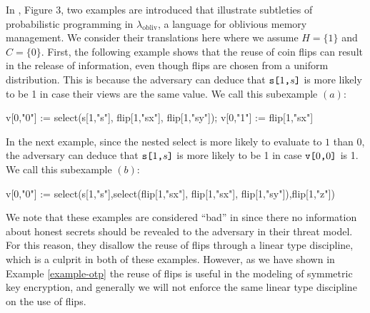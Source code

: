 \begin{example}
  \label{example-lambda-obliv}
  In \cite{darais2019language}, Figure 3, two examples are introduced that illustrate
  subtleties of probabilistic programming in
  $\lambda_{\mathrm{obliv}}$, a language for oblivious memory
  management. We consider their translations here where we
  assume $H = \{ 1 \}$ and $C = \{ 0 \}$. First, the following
  example shows that the reuse of coin flips can result in the release of
  information, even though flips are chosen from a uniform
  distribution. This is because the adversary can deduce that
  $\texttt{s[}1\texttt{,}s\texttt{]}$ is more likely to be 1 in case their views are the
  same value. We call this subexample $(a)$:
  \begin{verbatimtab}
    v[0,"0"] := select(s[1,"s"], flip[1,"sx"], flip[1,"sy"]);
    v[0,"1"] := flip[1,"sx"] \end{verbatimtab}
  In the next example, since the nested select is more likely to evaluate
  to $1$ than $0$, the adversary can deduce that $\texttt{s[}1\texttt{,}s\texttt{]}$ is
  more likely to be 1 in case $\texttt{v[}0\texttt{,}0\texttt{]}$ is 1. We call this subexample $(b)$:
  \begin{verbatimtab}
  v[0,"0"] := select(s[1,"s"],select(flip[1,"sx"], flip[1,"sx"], flip[1,"sy"]),flip[1,"z"]) \end{verbatimtab}
  We note that these examples are considered ``bad'' in \cite{darais2019language} since there
  no information about honest secrets should be revealed to the adversary in
  their threat model. For this reason, they disallow the reuse of flips through a
  linear type discipline, which is a culprit in both of these examples. However,
  as we have shown in Example \ref{example-otp} the reuse of flips is useful in
  the modeling of symmetric key encryption, and generally we will not enforce
  the same linear type discipline on the use of flips.
\end{example}

